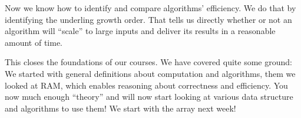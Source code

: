 \documentclass{aldast}
\begin{document}
Now we know how to identify and compare algorithms' efficiency. We do
that by identifying the underling growth order. That tells us directly
whether or not an algorithm will ``scale'' to large inputs and deliver
its results in a reasonable amount of time.

This closes the foundations of our courses. We have covered quite some
ground: We started with general definitions about computation and
algorithms, them we looked at RAM, which enables reasoning about
correctness and efficiency. You now much enough ``theory'' and will
now start looking at various data structure and algorithms to use
them! We start with the array next week!



\end{document}

